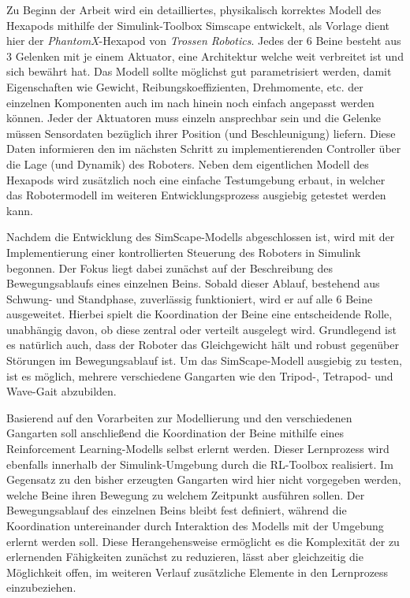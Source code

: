 Zu Beginn der Arbeit wird ein detailliertes, physikalisch korrektes Modell des Hexapods mithilfe der Simulink-Toolbox Simscape entwickelt, als Vorlage dient hier der \emph{PhantomX}-Hexapod von \emph{Trossen Robotics}.
Jedes der 6 Beine besteht aus 3 Gelenken mit je einem Aktuator, eine Architektur welche weit verbreitet ist und sich bewährt hat.
Das Modell sollte möglichst gut parametrisiert werden, damit Eigenschaften wie Gewicht, Reibungskoeffizienten, Drehmomente, etc. der einzelnen Komponenten auch im nach hinein noch einfach angepasst werden können.
Jeder der Aktuatoren muss einzeln ansprechbar sein und die Gelenke müssen Sensordaten bezüglich ihrer Position (und Beschleunigung) liefern.
Diese Daten informieren den im nächsten Schritt zu implementierenden Controller über die Lage (und Dynamik) des Roboters.
Neben dem eigentlichen Modell des Hexapods wird zusätzlich noch eine einfache Testumgebung erbaut, in welcher das Robotermodell im weiteren Entwicklungsprozess ausgiebig getestet werden kann.

Nachdem die Entwicklung des SimScape-Modells abgeschlossen ist, wird mit der Implementierung einer kontrollierten Steuerung des Roboters in Simulink begonnen.
Der Fokus liegt dabei zunächst auf der Beschreibung des Bewegungsablaufs eines einzelnen Beins.
Sobald dieser Ablauf, bestehend aus Schwung- und Standphase, zuverlässig funktioniert, wird er auf alle 6 Beine ausgeweitet.
Hierbei spielt die Koordination der Beine eine entscheidende Rolle, unabhängig davon, ob diese zentral oder verteilt ausgelegt wird.
Grundlegend ist es natürlich auch, dass der Roboter das Gleichgewicht hält und robust gegenüber Störungen im Bewegungsablauf ist.
Um das SimScape-Modell ausgiebig zu testen, ist es möglich, mehrere verschiedene Gangarten wie den Tripod-, Tetrapod- und Wave-Gait abzubilden.

Basierend auf den Vorarbeiten zur Modellierung und den verschiedenen Gangarten soll anschließend die Koordination der Beine mithilfe eines Reinforcement Learning-Modells selbst erlernt werden.
Dieser Lernprozess wird ebenfalls innerhalb der Simulink-Umgebung durch die RL-Toolbox realisiert.
Im Gegensatz zu den bisher erzeugten Gangarten wird hier nicht vorgegeben werden, welche Beine ihren Bewegung zu welchem Zeitpunkt ausführen sollen.
Der Bewegungsablauf des einzelnen Beins bleibt fest definiert, während die Koordination untereinander durch Interaktion des Modells mit der Umgebung erlernt werden soll. 
Diese Herangehensweise ermöglicht es die Komplexität der zu erlernenden Fähigkeiten zunächst zu reduzieren, lässt aber gleichzeitig die Möglichkeit offen, im weiteren Verlauf zusätzliche Elemente in den Lernprozess einzubeziehen.


